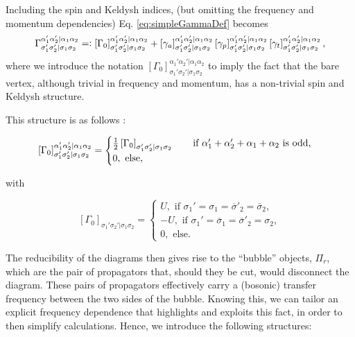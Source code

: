 \documentclass[12pt,a4paper,roman]{article}
\newcommand{\eqdef}{=\vcentcolon}
\begin{document}
Including the spin and Keldysh indices, (but omitting the frequency and momentum dependencies) Eq. \eqref{eq:simpleGammaDef} becomes
\begin{equation}
	\Gamma_{\sigma_1'\sigma_2'|\sigma_1\sigma_2}^{\alpha_1'\alpha_2'|\alpha_1\alpha_2} \eqdef \left[\Gamma_0 \right]_{\sigma_1'\sigma_2'|\sigma_1\sigma_2}^{\alpha_1'\alpha_2'|\alpha_1\alpha_2} + \left[\gamma_a \right]_{\sigma_1'\sigma_2'|\sigma_1\sigma_2}^{\alpha_1'\alpha_2'|\alpha_1\alpha_2}\left[\gamma_p \right]_{\sigma_1'\sigma_2'|\sigma_1\sigma_2}^{\alpha_1'\alpha_2'|\alpha_1\alpha_2}\left[\gamma_t \right]_{\sigma_1'\sigma_2'|\sigma_1\sigma_2}^{\alpha_1'\alpha_2'|\alpha_1\alpha_2},
\end{equation}
where we introduce the notation $\left[\Gamma_0 \right]_{\sigma_1'\sigma_2'|\sigma_1\sigma_2}^{\alpha_1'\alpha_2'|\alpha_1\alpha_2}$ to imply the fact that the bare vertex, although trivial in frequency and momentum, has a non-trivial spin and Keldysh structure.

This structure is as follows \cite{PhysRevB.81.195109}:

\begin{equation}
	\left[\Gamma_0 \right]_{\sigma_1'\sigma_2'|\sigma_1\sigma_2}^{\alpha_1'\alpha_2'|\alpha_1\alpha_2} = \begin{cases}
	\frac{1}{2} \left[\Gamma_0 \right]_{\sigma_1'\sigma_2'|\sigma_1\sigma_2} \hspace{0.7cm}\text{if } \alpha_1'+\alpha_2' + \alpha_1+\alpha_2 \text{ is odd,} \\
	0, \text{ else,}
	\end{cases}
	\label{eq:defGamma0withKeldysh}
\end{equation}

with 

\begin{equation}
\left[\Gamma_0 \right]_{\sigma_1'\sigma_2'|\sigma_1\sigma_2} = \begin{cases}
U, \text{ if } \sigma_1'=\sigma_1= \overline{\sigma}'_2=\overline{\sigma}_2, \\
-U, \text{ if } \sigma_1'=\overline{\sigma}_1= \overline{\sigma}'_2=\sigma_2, \\
0, \text{ else.}
\end{cases}
\label{eq:defGamma0withourKeldysh}
\end{equation}

The reducibility of the diagrams then gives rise to the ``bubble'' objects, $\Pi_r$, which are the pair of propagators that, should they be cut, would disconnect the diagram. These pairs of propagators effectively carry a (bosonic) transfer frequency between the two sides of the bubble. Knowing this, we can tailor an explicit frequency dependence that highlights and exploits this fact, in order to then simplify calculations. Hence, we introduce the following structures:
\end{document}
